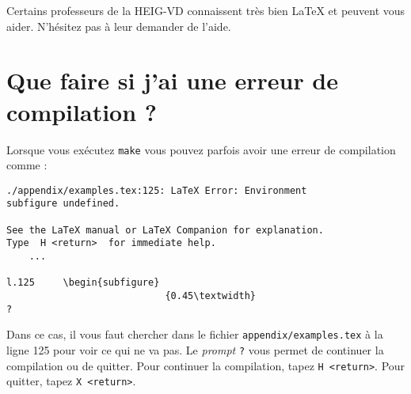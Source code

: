 Certains professeurs de la HEIG-VD connaissent très bien LaTeX et peuvent vous aider. N'hésitez pas à leur demander de l'aide.

\section{Que faire si j'ai une erreur de compilation ?}

Lorsque vous exécutez \verb!make! vous pouvez parfois avoir une erreur de compilation comme :

\begin{verbatim}
./appendix/examples.tex:125: LaTeX Error: Environment
subfigure undefined.

See the LaTeX manual or LaTeX Companion for explanation.
Type  H <return>  for immediate help.
    ...

l.125     \begin{subfigure}
                            {0.45\textwidth}
?
\end{verbatim}

Dans ce cas, il vous faut chercher dans le fichier \verb!appendix/examples.tex! à la ligne 125 pour voir ce qui ne va pas. Le \emph{prompt} \verb!?! vous permet de continuer la compilation ou de quitter. Pour continuer la compilation, tapez \verb!H <return>!. Pour quitter, tapez \verb!X <return>!.